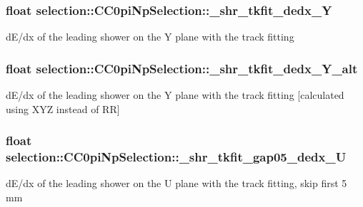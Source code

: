 \subsubsection[{\texorpdfstring{\+\_\+shr\+\_\+tkfit\+\_\+dedx\+\_\+Y}{_shr_tkfit_dedx_Y}}]{\setlength{\rightskip}{0pt plus 5cm}float selection\+::\+C\+C0pi\+Np\+Selection\+::\+\_\+shr\+\_\+tkfit\+\_\+dedx\+\_\+Y\hspace{0.3cm}{\ttfamily [private]}}\hypertarget{classselection_1_1CC0piNpSelection_ababbbc32babdef645c2edc613713ceb7}{}\label{classselection_1_1CC0piNpSelection_ababbbc32babdef645c2edc613713ceb7}
d\+E/dx of the leading shower on the Y plane with the track fitting 
\subsubsection[{\texorpdfstring{\+\_\+shr\+\_\+tkfit\+\_\+dedx\+\_\+\+Y\+\_\+alt}{_shr_tkfit_dedx_Y_alt}}]{\setlength{\rightskip}{0pt plus 5cm}float selection\+::\+C\+C0pi\+Np\+Selection\+::\+\_\+shr\+\_\+tkfit\+\_\+dedx\+\_\+\+Y\+\_\+alt\hspace{0.3cm}{\ttfamily [private]}}\hypertarget{classselection_1_1CC0piNpSelection_a581a6115360136c7364f421b9f1ca4fe}{}\label{classselection_1_1CC0piNpSelection_a581a6115360136c7364f421b9f1ca4fe}
d\+E/dx of the leading shower on the Y plane with the track fitting \mbox{[}calculated using X\+YZ instead of RR\mbox{]} 
\subsubsection[{\texorpdfstring{\+\_\+shr\+\_\+tkfit\+\_\+gap05\+\_\+dedx\+\_\+U}{_shr_tkfit_gap05_dedx_U}}]{\setlength{\rightskip}{0pt plus 5cm}float selection\+::\+C\+C0pi\+Np\+Selection\+::\+\_\+shr\+\_\+tkfit\+\_\+gap05\+\_\+dedx\+\_\+U\hspace{0.3cm}{\ttfamily [private]}}\hypertarget{classselection_1_1CC0piNpSelection_ad0504ef7cf7c8fa5a0059fbaedd6861b}{}\label{classselection_1_1CC0piNpSelection_ad0504ef7cf7c8fa5a0059fbaedd6861b}
d\+E/dx of the leading shower on the U plane with the track fitting, skip first 5 mm 
